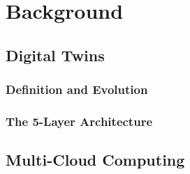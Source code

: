 \chapter{\label{chap:background}Background}


\section{Digital Twins}

\subsection{Definition and Evolution}

\subsection{The 5-Layer Architecture}
%
%

\section{Multi-Cloud Computing}

